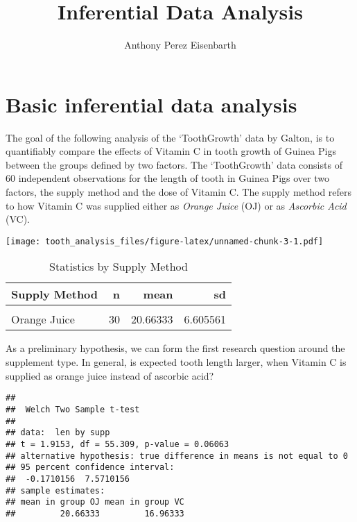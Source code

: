 \documentclass[
]{article}
\title{Inferential Data Analysis}
\author{Anthony Perez Eisenbarth}
\date{}
\begin{document}
\maketitle

\hypertarget{basic-inferential-data-analysis}{%
\section{Basic inferential data
analysis}\label{basic-inferential-data-analysis}}

The goal of the following analysis of the `ToothGrowth' data by Galton,
is to quantifiably compare the effects of Vitamin C in tooth growth of
Guinea Pigs between the groups defined by two factors. The `ToothGrowth'
data consists of 60 independent observations for the length of tooth in
Guinea Pigs over two factors, the supply method and the dose of Vitamin
C. The supply method refers to how Vitamin C was supplied either as
\emph{Orange Juice} (OJ) or as \emph{Ascorbic Acid} (VC).

\texttt{[image: tooth\_analysis\_files/figure-latex/unnamed-chunk-3-1.pdf]}

\begin{table}[H]

\caption{\label{tab:unnamed-chunk-4}Statistics by Supply Method}
\centering
\begin{tabular}[t]{lrrr}
\toprule
Supply Method & n & mean & sd\\
\midrule
\cellcolor{gray!6}{Ascorbic Acid} & \cellcolor{gray!6}{30} & \cellcolor{gray!6}{16.96333} & \cellcolor{gray!6}{8.266029}\\
Orange Juice & 30 & 20.66333 & 6.605561\\
\bottomrule
\end{tabular}
\end{table}

As a preliminary hypothesis, we can form the first research question
around the supplement type. In general, is expected tooth length larger,
when Vitamin C is supplied as orange juice instead of ascorbic acid?

\begin{verbatim}
## 
##  Welch Two Sample t-test
## 
## data:  len by supp
## t = 1.9153, df = 55.309, p-value = 0.06063
## alternative hypothesis: true difference in means is not equal to 0
## 95 percent confidence interval:
##  -0.1710156  7.5710156
## sample estimates:
## mean in group OJ mean in group VC 
##         20.66333         16.96333
\end{verbatim}
\end{document}
